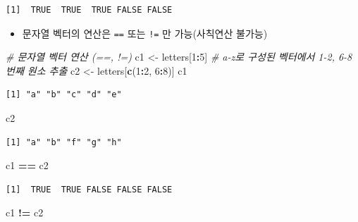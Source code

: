 \documentclass[
  11pt,
]{krantz}
\newenvironment{Shaded}{\begin{snugshade}}{\end{snugshade}}
\newcommand{\CommentTok}[1]{\textcolor[rgb]{0.37,0.37,0.37}{\textit{#1}}}
\newcommand{\DecValTok}[1]{\textcolor[rgb]{0.06,0.06,0.06}{#1}}
\newcommand{\KeywordTok}[1]{\textcolor[rgb]{0.27,0.27,0.27}{\textbf{#1}}}
\newcommand{\NormalTok}[1]{#1}
\newcommand{\OperatorTok}[1]{\textcolor[rgb]{0.43,0.43,0.43}{\textbf{#1}}}
\newcommand{\StringTok}[1]{\textcolor[rgb]{0.5,0.5,0.5}{#1}}
\providecommand{\tightlist}{%
  \setlength{\itemsep}{0pt}\setlength{\parskip}{0pt}}
\begin{document}
\begin{verbatim}
[1]  TRUE  TRUE  TRUE FALSE FALSE
\end{verbatim}

\normalsize

\begin{itemize}
\tightlist
\item
  문자열 벡터의 연산은 \texttt{==} 또는 \texttt{!=} 만 가능(사칙연산 불가능)
\end{itemize}

\footnotesize

\begin{Shaded}
\begin{Highlighting}[]
\CommentTok{# 문자열 벡터 연산 (==, !=)}
\NormalTok{c1 <-}\StringTok{ }\NormalTok{letters[}\DecValTok{1}\OperatorTok{:}\DecValTok{5}\NormalTok{]}
\CommentTok{# a-z로 구성된 벡터에서 1-2, 6-8 번째 원소 추출}
\NormalTok{c2 <-}\StringTok{ }\NormalTok{letters[}\KeywordTok{c}\NormalTok{(}\DecValTok{1}\OperatorTok{:}\DecValTok{2}\NormalTok{, }\DecValTok{6}\OperatorTok{:}\DecValTok{8}\NormalTok{)] }
\NormalTok{c1}
\end{Highlighting}
\end{Shaded}

\begin{verbatim}
[1] "a" "b" "c" "d" "e"
\end{verbatim}

\begin{Shaded}
\begin{Highlighting}[]
\NormalTok{c2}
\end{Highlighting}
\end{Shaded}

\begin{verbatim}
[1] "a" "b" "f" "g" "h"
\end{verbatim}

\begin{Shaded}
\begin{Highlighting}[]
\NormalTok{c1 }\OperatorTok{==}\StringTok{ }\NormalTok{c2}
\end{Highlighting}
\end{Shaded}

\begin{verbatim}
[1]  TRUE  TRUE FALSE FALSE FALSE
\end{verbatim}

\begin{Shaded}
\begin{Highlighting}[]
\NormalTok{c1 }\OperatorTok{!=}\StringTok{ }\NormalTok{c2}
\end{Highlighting}
\end{Shaded}
\end{document}
